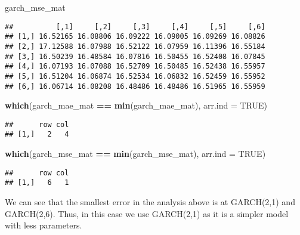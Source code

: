 \documentclass[]{article}
\newenvironment{Shaded}{\begin{snugshade}}{\end{snugshade}}
\newcommand{\KeywordTok}[1]{\textcolor[rgb]{0.13,0.29,0.53}{\textbf{#1}}}
\newcommand{\DataTypeTok}[1]{\textcolor[rgb]{0.13,0.29,0.53}{#1}}
\newcommand{\StringTok}[1]{\textcolor[rgb]{0.31,0.60,0.02}{#1}}
\newcommand{\OtherTok}[1]{\textcolor[rgb]{0.56,0.35,0.01}{#1}}
\newcommand{\OperatorTok}[1]{\textcolor[rgb]{0.81,0.36,0.00}{\textbf{#1}}}
\newcommand{\NormalTok}[1]{#1}
\begin{document}
\begin{Shaded}
\begin{Highlighting}[]
\NormalTok{garch_mse_mat}
\end{Highlighting}
\end{Shaded}

\begin{verbatim}
##          [,1]     [,2]     [,3]     [,4]     [,5]     [,6]
## [1,] 16.52165 16.08806 16.09222 16.09005 16.09269 16.08826
## [2,] 17.12588 16.07988 16.52122 16.07959 16.11396 16.55184
## [3,] 16.50239 16.48584 16.07816 16.50455 16.52408 16.07845
## [4,] 16.07193 16.07088 16.52709 16.50485 16.52438 16.55957
## [5,] 16.51204 16.06874 16.52534 16.06832 16.52459 16.55952
## [6,] 16.06714 16.08208 16.48486 16.48486 16.51965 16.55959
\end{verbatim}

\begin{Shaded}
\begin{Highlighting}[]
\KeywordTok{which}\NormalTok{(garch_mae_mat }\OperatorTok{==}\StringTok{ }\KeywordTok{min}\NormalTok{(garch_mae_mat), }\DataTypeTok{arr.ind =} \OtherTok{TRUE}\NormalTok{)}
\end{Highlighting}
\end{Shaded}

\begin{verbatim}
##      row col
## [1,]   2   4
\end{verbatim}

\begin{Shaded}
\begin{Highlighting}[]
\KeywordTok{which}\NormalTok{(garch_mse_mat }\OperatorTok{==}\StringTok{ }\KeywordTok{min}\NormalTok{(garch_mse_mat), }\DataTypeTok{arr.ind =} \OtherTok{TRUE}\NormalTok{)}
\end{Highlighting}
\end{Shaded}

\begin{verbatim}
##      row col
## [1,]   6   1
\end{verbatim}

We can see that the smallest error in the analysis above is at
GARCH(2,1) and GARCH(2,6). Thus, in this case we use GARCH(2,1) as it is
a simpler model with less parameters.
\end{document}
